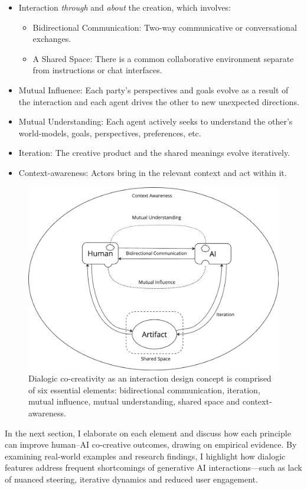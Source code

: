     \begin{itemize}
        \item Interaction \textit{through} and \textit{about} the creation, which involves: 
        \begin{itemize}
            \item Bidirectional Communication: Two-way communicative or conversational exchanges.
            \item A Shared Space: There is a common collaborative environment separate from instructions or chat interfaces.
        \end{itemize}
        \item Mutual Influence: Each party’s perspectives and goals evolve as a result of the interaction and each agent drives the other to new unexpected directions.
        \item Mutual Understanding: Each agent actively seeks to understand the other's world-models, goals, perspectives, preferences, etc.
        \item Iteration: The creative product and the shared meanings evolve iteratively.
        \item Context-awareness: Actors bring in the relevant context and act within it.
    \end{itemize}


    \begin{figure}
    \centering
    \includegraphics[width=0.75\linewidth]{dialogicelements.png}
    \caption{Dialogic co-creativity as an interaction design concept is comprised of six
essential elements: bidirectional communication, iteration, mutual influence, mutual understanding, shared space and context-awareness. }
    \label{fig:enter-label}
\end{figure}


In the next section, I elaborate on each element and discuss how each principle can improve human–AI co-creative outcomes, drawing on empirical evidence. By examining real-world examples and research findings, I highlight how dialogic features address frequent shortcomings of generative AI interactions—such as lack of nuanced steering, iterative dynamics and reduced user engagement.

